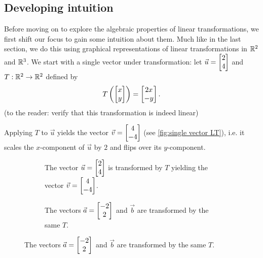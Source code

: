 \subsection{Developing intuition}
Before moving on to explore the algebraic properties of linear transformations, we first shift our focus to gain some intuition about them. Much like in the last section, we do this using graphical representations of linear transformations in $\mathbb{R}^{2}$ and $\mathbb{R}^{3}$. We start with a single vector under transformation: let $\vec{u}=\colvec{2;4}$ and $T:\mathbb{R}^{2}\to\mathbb{R}^{2}$ defined by
\begin{equation}
	T\left( \colvec{x;y} \right) = \colvec{2x;-y}.
\end{equation}
(to the reader: verify that this transformation is indeed linear)

Applying $T$ to $\vec{u}$ yields the vector $\vec{v}=\colvec{4;-4}$ (see \autoref{fig:single vector LT}), i.e. it scales the $x$-component of $\vec{u}$ by $2$ and flips over its $y$-component.

\begin{figure}
	\centering
	\begin{subfigure}[t]{0.45\textwidth}
		\caption{The vector $\vec{u}=\colvec{2;4}$ is transformed by $T$ yielding the vector $\vec{v}=\colvec{4;-4}$.}
		\label{fig:single vector LT}
	\end{subfigure}
	\hfill
	\begin{subfigure}[t]{0.45\textwidth}
		\centering
		\caption{The vectors $\vec{a}=\colvec{-2;2}$ and $\vec{b}$ are transformed by the same $T$.}
		\label{fig:two vectors LT}
	\end{subfigure}
\end{figure}

